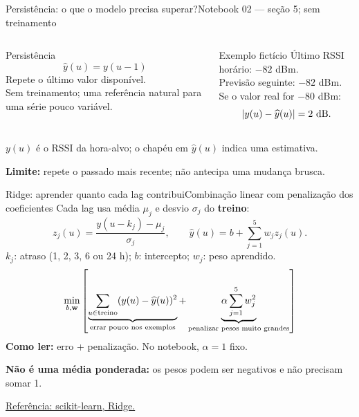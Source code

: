 \documentclass[aspectratio=169,10pt]{beamer}
\begin{document}
\begin{frame}{Persistência: o que o modelo precisa superar?}{Notebook 02 — seção 5; sem treinamento}
\begin{columns}[T]
\begin{block}{Persistência}
\[
\widehat y(u)=y(u-1)
\]
Repete o último valor disponível.\\[2mm]
Sem treinamento; uma referência natural para uma série pouco variável.
\end{block}
\begin{block}{Exemplo fictício}
Último RSSI horário: $-82$ dBm.\\
Previsão seguinte: $-82$ dBm.\\[2mm]
Se o valor real for $-80$ dBm:
\[
|y(u)-\widehat y(u)|=2\ {\rm dB}.
\]
\end{block}
\end{columns}
\vspace{3mm}
$y(u)$ é o RSSI da hora-alvo; o chapéu em $\widehat y(u)$ indica uma estimativa.
\par\vspace{2mm}
\textbf{Limite:} repete o passado mais recente; não antecipa uma mudança brusca.
\end{frame}

\begin{frame}{Ridge: aprender quanto cada lag contribui}{Combinação linear com penalização dos coeficientes}
\small
\setlength{\abovedisplayskip}{4pt}\setlength{\belowdisplayskip}{4pt}
\setlength{\abovedisplayshortskip}{0pt}\setlength{\belowdisplayshortskip}{0pt}
Cada lag usa média $\mu_j$ e desvio $\sigma_j$ do \textbf{treino}:
\[
z_j(u)=\frac{y(u-k_j)-\mu_j}{\sigma_j},
\qquad
\widehat y(u)=b+\sum_{j=1}^{5}w_jz_j(u).
\]
$k_j$: atraso (1, 2, 3, 6 ou 24 h); $b$: intercepto; $w_j$: peso aprendido.
\[
\min_{b,\mathbf w}\left[
\underbrace{\sum_{u\in{\rm treino}}(y(u)-\widehat y(u))^2}_{\text{errar pouco nos exemplos}}
+
\underbrace{\alpha\sum_{j=1}^{5}w_j^2}_{\text{penalizar pesos muito grandes}}
\right]
\]
\textbf{Como ler:} erro + penalização. No notebook, $\alpha=1$ fixo.
\par\vspace{2mm}
\textbf{Não é uma média ponderada:} os pesos podem ser negativos e não precisam somar 1.
\par\scriptsize \href{https://scikit-learn.org/stable/modules/generated/sklearn.linear_model.Ridge.html}{Referência: scikit-learn, Ridge.}
\end{frame}
\end{document}
